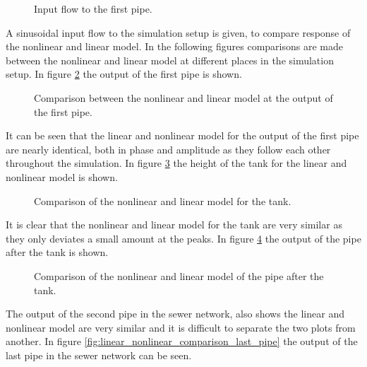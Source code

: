 \begin{figure}[H]
 \centering
 
\caption{Input flow to the first pipe.}
\label{fig:linear_nonlinear_comparison_input_to_first_pipe}
\end{figure}
A sinusoidal input flow to the simulation setup is given, to compare response of the nonlinear and linear model. 
In the following figures comparisons are made between the nonlinear and linear model at different places in the simulation setup. In figure \ref{fig:linear_nonlinear_comparison_input_first_pipe_into_tank} the output of the first pipe is shown.

\begin{figure}[H]
 \centering
 
\caption{Comparison between the nonlinear and linear model at the output of the first pipe.}
\label{fig:linear_nonlinear_comparison_input_first_pipe_into_tank}
\end{figure}

It can be seen that the linear and nonlinear model for the output of the first pipe are nearly identical, both in phase and amplitude as they follow each other throughout the simulation. In figure \ref{fig:linear_nonlinear_comparison_tank_height} the height of the tank for the linear and nonlinear model is shown.   

\begin{figure}[H]
 \centering
 
\caption{Comparison of the nonlinear and linear model for the tank. }
\label{fig:linear_nonlinear_comparison_tank_height}
\end{figure}
 
It is clear that the nonlinear and linear model for the tank are very similar as they only deviates a small amount at the peaks. In figure \ref{fig:linear_nonlinear_comparison_pipe_after_tank} the output of the pipe after the tank is shown.  

\begin{figure}[H]
 \centering
 
\caption{Comparison of the nonlinear and linear model of the pipe after the tank.}
\label{fig:linear_nonlinear_comparison_pipe_after_tank}
\end{figure}
  
The output of the second pipe in the sewer network, also shows the linear and nonlinear model are very similar and it is difficult to separate the two plots from another. In figure \ref{fig:linear_nonlinear_comparison_last_pipe} the output of the last pipe in the sewer network can be seen. 

